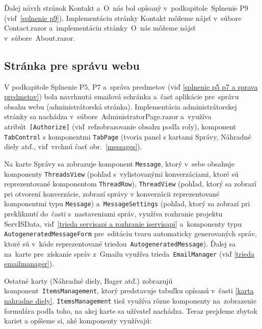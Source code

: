 Ďalej návrh stránok Kontakt a~O~nás bol opísaný v~podkapitole~Splnenie P9 (viď~\ref{splnenie p9}). Implementáciu stránky Kontakt môžeme nájsť v~súbore Contact.razor a~implementáciu stránky~O~nás môžeme nájsť v~súbore~About.razor.

\subsection{Stránka pre správu webu}

V podkapitole Splnenie P5, P7 a~správa predmetov (viď \ref{splnenie p5 p7 a sprava predmetov}) bola navrhnutá emailová schránka a~časť aplikácie pre~správu obsahu webu (administrátorská stránka). Implementácia administrátorskej stránky sa nachádza v~súbore~AdministratorPage.razor a~využíva atribút~\verb|[Authorize]| (viď~ref{zobrazovanie obsahu podľa roly}), komponent \verb|TabControl| s komponentmi \verb|TabPage| (tvoria panel s kartami Správy, Náhradné diely atď., viď~vrchnú časť obr.~\ref{messages}). 

Na karte Správy sa zobrazuje komponent \verb|Message|, ktorý v~sebe obsahuje komponenty \verb|ThreadsView| (pohľad s~vylistovanými konverzáciami, ktoré sú reprezentované komponentom \verb|ThreadRow|), \verb|ThreadView| (pohľad, ktorý sa zobrazí pri otvorení konverzácie, zobrazí správy v konverzácii reprezentované komponentmi typu \verb|Message|) a~\verb|MessageSettings| (pohľad, ktorý sa zobrazí pri prekliknutí do~časti s~nastaveniami správ, využíva rozhranie projektu ServISData, viď~\ref{trieda servisapi a rozhranie iservisapi} a~komponenty typu \verb|AutogeneratedMessageForm| pre~editáciu tvaru automaticky generovaných správ, ktoré sú v~kóde reprezentované triedou~\verb|AutogeneratedMessage|). Ďalej sa na~karte pre~získanie správ z~Gmailu využíva trieda~\verb|EmailManager| (viď \ref{trieda emailmanager}).

Ostatné karty (Náhradné diely, Bager atď.) zobrazujú komponent~\verb|ItemsManagement|, ktorý predstavuje tabuľku opísanú v~časti \ref{karta nahradne diely}. \verb|ItemsManagement| tiež využíva rôzne komponenty na~zobrazenie formulára podľa toho, na akej karte sa užívateľ nachádza. Teraz prejdeme zbytok kariet a opíšeme si, aké komponenty využívajú:

